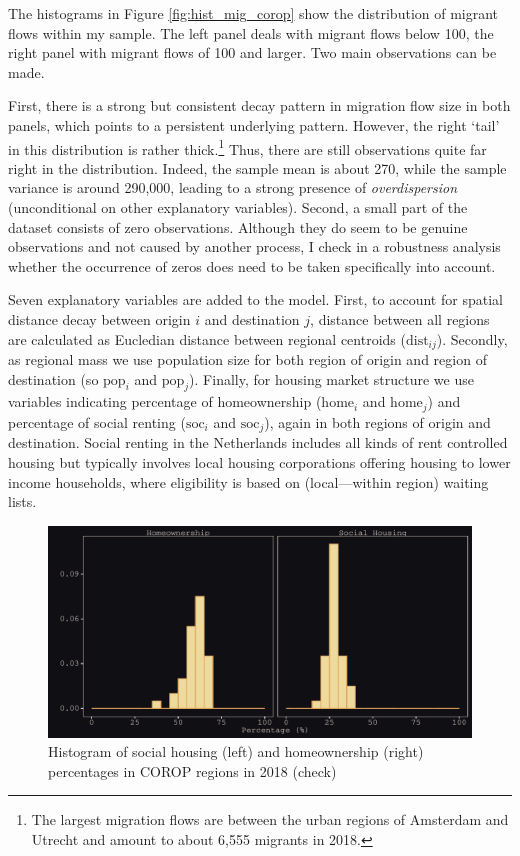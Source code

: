 \documentclass[fleqn,10pt]{SelfArx} %
\begin{document}
The histograms in Figure \ref{fig:hist_mig_corop} show the distribution of
migrant flows within my sample. The left panel deals with migrant flows below
100, the right panel with migrant flows of 100 and larger. Two main observations
can be made.

First, there is a strong but consistent decay pattern in migration flow size in
both panels, which points to a persistent underlying pattern. However, the right
`tail' in this distribution is rather thick.\footnote{The largest migration
  flows are between the urban regions of Amsterdam and Utrecht and amount to about
  6,555 migrants in 2018.} Thus, there are still observations quite far right in
the distribution. Indeed, the sample mean is about 270, while the sample
variance is around 290,000, leading to a strong presence of
\emph{overdispersion} (unconditional on other explanatory variables). Second, a
small part of the dataset consists of zero observations. Although they do seem
to be genuine observations and not caused by another process, I check in a
robustness analysis whether the occurrence of zeros does need to be taken
specifically into account.

Seven explanatory variables are added to the model. First, to account for
spatial distance decay between origin $i$ and destination $j$, distance between
all regions are calculated as Eucledian distance between regional centroids
($\text{dist}_{ij}$). Secondly, as regional mass we use population size for
both region of origin and region of destination (so $\text{pop}_i$ and
$\text{pop}_j$). Finally, for housing market structure we use variables
indicating percentage of homeownership ($\text{home}_i$ and $\text{home}_j$) and
percentage of social renting ($\text{soc}_i$ and $\text{soc}_j$), again in both
regions of origin and destination. Social renting in the Netherlands includes all
kinds of rent controlled housing but typically involves local housing
corporations offering housing to lower income households, where eligibility is
based on (local---within region) waiting lists.

\begin{figure}[ht]\centering %
  \includegraphics[width=0.8\linewidth]{./../../fig/hist_housing_corop.pdf}
  \caption{Histogram of social housing (left) and homeownership (right)
    percentages in COROP regions in 2018 (check)}
  \label{fig:housing_mig}
\end{figure}
\end{document}
